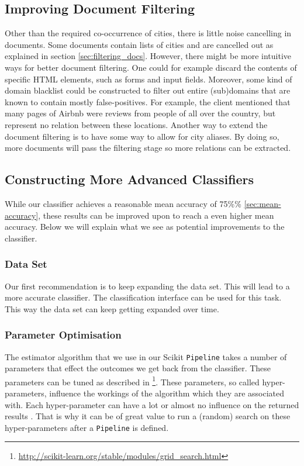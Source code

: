 \subsection{Improving Document Filtering}
Other than the required co-occurrence of cities, there is little noise cancelling in documents. Some documents contain lists of cities and are cancelled out as explained in section \ref{sec:filtering_docs}. However, there might be more intuitive ways for better document filtering. One could for example discard the contents of specific HTML elements, such as forms and input fields. Moreover, some kind of domain blacklist could be constructed to filter out entire (sub)domains that are known to contain mostly false-positives. For example, the client mentioned that many pages of Airbnb were reviews from people of all over the country, but represent no relation between these locations. Another way to extend the document filtering is to have some way to allow for city aliases. By doing so, more documents will pass the filtering stage so more relations can be extracted.

\subsection{Constructing More Advanced Classifiers}
While our classifier achieves a reasonable mean accuracy of 75\%\% \ref{sec:mean-accuracy}, these results can be improved upon to reach a even higher mean accuracy. Below we will explain what we see as potential improvements to the classifier.

\subsubsection{Data Set}
Our first recommendation is to keep expanding the data set. This will lead to a more accurate classifier. The classification interface can be used for this task. This way the data set can keep getting expanded over time.
\subsubsection{Parameter Optimisation}
The estimator algorithm that we use in our Scikit \texttt{Pipeline} takes a number of parameters that effect the outcomes we get back from the classifier. These parameters can be tuned as described in \footnote{\url{http://scikit-learn.org/stable/modules/grid_search.html}}. These parameters, so called hyper-parameters, influence the workings of the algorithm which they are associated with. Each hyper-parameter can have a lot or almost no influence on the returned results \cite{bergstra2012random}. That is why it can be of great value to run a (random) search on these hyper-parameters after a \texttt{Pipeline} is defined.
